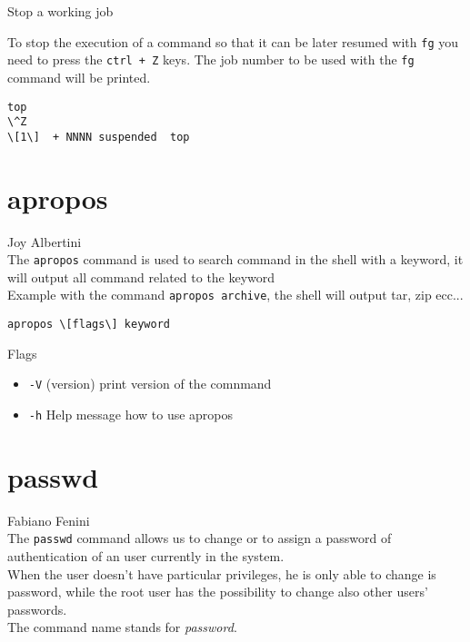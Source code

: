 \documentclass[hidelinks,12pt,a4paper,numbers=enddot]{scrartcl}
\begin{document}
Stop a working job

To stop the execution of a command so that it can be later resumed with \texttt{fg}
you need to press the \texttt{ctrl + Z} keys. The job number to be used with the
\texttt{fg} command will be printed.

\begin{verbatim}
top
\^Z
\[1\]  + NNNN suspended  top
\end{verbatim}

\section{apropos}


\large Joy Albertini \normalsize\\



The \texttt{apropos} command is used to search command in the shell with a keyword,
it will output all command related to the keyword \\

Example with the command \texttt{apropos archive}, the shell will output tar, zip ecc...\\

\begin{verbatim}
apropos \[flags\] keyword
\end{verbatim}

Flags

\begin{itemize}
  \item \texttt{-V} (version) print version of the comnmand\\
  \item \texttt{-h} Help message how to use apropos
\end{itemize}

\section{passwd}


\large Fabiano Fenini \normalsize\\


The \texttt{passwd} command allows us to change or to assign a password of authentication
of an user currently in the system.\\
When the user doesn’t have particular privileges, he is only able to change is password,
while the root user has the possibility to change also other users’ passwords.\\
The command name stands for \emph{password}.\\
\end{document}
